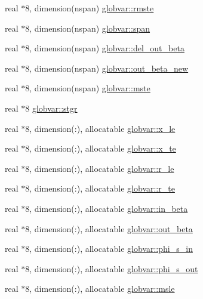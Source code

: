 \begin{DoxyCompactItemize}
\item 
real $\ast$8, dimension(nspan) \hyperlink{namespaceglobvar_a74bf48252c7df2668280317e7f2054de}{globvar\+::rmste}
\item 
real $\ast$8, dimension(nspan) \hyperlink{namespaceglobvar_a5bd9849f460d93b2cb26f60fd2b04791}{globvar\+::span}
\item 
real $\ast$8, dimension(nspan) \hyperlink{namespaceglobvar_a6448057e4ac1ead4b9b9fa353a168a08}{globvar\+::del\+\_\+out\+\_\+beta}
\item 
real $\ast$8, dimension(nspan) \hyperlink{namespaceglobvar_a07729166d5dd2b6a73e99fa9f7f4c3fc}{globvar\+::out\+\_\+beta\+\_\+new}
\item 
real $\ast$8, dimension(nspan) \hyperlink{namespaceglobvar_a4f0ab349408ce25b662d33a12ec6993e}{globvar\+::mste}
\item 
real $\ast$8 \hyperlink{namespaceglobvar_aca622d395a1e0e4edb15a47f52e6352f}{globvar\+::stgr}
\item 
real $\ast$8, dimension(\+:), allocatable \hyperlink{namespaceglobvar_a97f6e6fb7adb402ab21940c4d160585c}{globvar\+::x\+\_\+le}
\item 
real $\ast$8, dimension(\+:), allocatable \hyperlink{namespaceglobvar_a68ad26d59e4d62a30908beaf98bdb89d}{globvar\+::x\+\_\+te}
\item 
real $\ast$8, dimension(\+:), allocatable \hyperlink{namespaceglobvar_acdf6123c5a99341b8318439c395573a5}{globvar\+::r\+\_\+le}
\item 
real $\ast$8, dimension(\+:), allocatable \hyperlink{namespaceglobvar_aa65d26a2d56169f3f2c0ad70408868f2}{globvar\+::r\+\_\+te}
\item 
real $\ast$8, dimension(\+:), allocatable \hyperlink{namespaceglobvar_a3b0ba34304a646f87d0ee37d4b8d8618}{globvar\+::in\+\_\+beta}
\item 
real $\ast$8, dimension(\+:), allocatable \hyperlink{namespaceglobvar_ac973fc13b42ddc6cb1c35762966c4f96}{globvar\+::out\+\_\+beta}
\item 
real $\ast$8, dimension(\+:), allocatable \hyperlink{namespaceglobvar_afc0c5598225e6044c065125b3a4abb11}{globvar\+::phi\+\_\+s\+\_\+in}
\item 
real $\ast$8, dimension(\+:), allocatable \hyperlink{namespaceglobvar_a9a3ae0b7ec948af43ece3fee824e7da2}{globvar\+::phi\+\_\+s\+\_\+out}
\item 
real $\ast$8, dimension(\+:), allocatable \hyperlink{namespaceglobvar_a5aa8f63b0ed7052d09ff37dd0a505100}{globvar\+::msle}
\item 

\end{DoxyCompactItemize}
